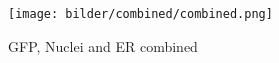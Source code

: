 \begin{figure}[H]
	\begin{center}
		\texttt{[image: bilder/combined/combined.png]}
		\caption{GFP, Nuclei and ER combined}\label{fig:combined}
	\end{center}
\end{figure}
